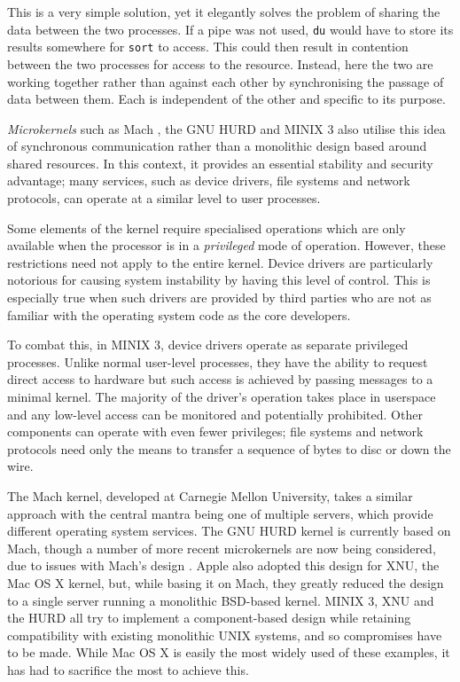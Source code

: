 This is a very simple solution, yet it elegantly solves the problem of
sharing the data between the two processes.  If a pipe was not used,
\texttt{du} would have to store its results somewhere for
\texttt{sort} to access.  This could then result in contention between
the two processes for access to the resource.  Instead, here the two
are working together rather than against each other by synchronising
the passage of data between them.  Each is independent of the other
and specific to its purpose.

\emph{Microkernels} such as Mach \cite{mach}, the GNU HURD \cite{hurd}
and MINIX 3 \cite{minix3} also utilise this idea of synchronous
communication rather than a monolithic design based around shared
resources.  In this context, it provides an essential stability and
security advantage; many services, such as device drivers, file
systems and network protocols, can operate at a similar level to user
processes.

Some elements of the kernel require specialised operations which are
only available when the processor is in a \emph{privileged} mode of
operation.  However, these restrictions need not apply to the entire
kernel.  Device drivers are particularly notorious for causing system
instability by having this level of control.  This is especially true
when such drivers are provided by third parties who are not as
familiar with the operating system code as the core developers.

To combat this, in MINIX 3, device drivers operate as separate
privileged processes.  Unlike normal user-level processes, they have
the ability to request direct access to hardware but such access is
achieved by passing messages to a minimal kernel.  The majority of the
driver's operation takes place in userspace and any low-level access
can be monitored and potentially prohibited.  Other components can
operate with even fewer privileges; file systems and network protocols
need only the means to transfer a sequence of bytes to disc or down
the wire.

The Mach kernel, developed at Carnegie Mellon University, takes a
similar approach with the central mantra being one of multiple
servers, which provide different operating system services.  The GNU
HURD kernel is currently based on Mach, though a number of more recent
microkernels are now being considered, due to issues with Mach's
design \cite{hurd:critique}.  Apple also adopted this design for XNU,
the Mac OS X kernel, but, while basing it on Mach, they greatly
reduced the design to a single server running a monolithic BSD-based
kernel.  MINIX 3, XNU and the HURD all try to implement a
component-based design while retaining compatibility with existing
monolithic UNIX systems, and so compromises have to be made.  While
Mac OS X is easily the most widely used of these examples, it has had
to sacrifice the most to achieve this.

